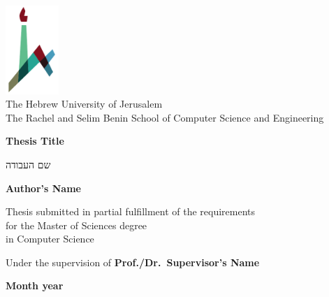 \documentclass[11pt]{book}
\begin{document}

\begin{titlepage}
    \begin{center}
        \vspace*{1cm}
        
        \includegraphics[width=0.15\textwidth]{huji_logo_notext.pdf}\\
        The Hebrew University of Jerusalem\\
        The Rachel and Selim Benin School of Computer Science and Engineering
        
        \vspace{2cm}
        
        {\Large \textbf{Thesis Title}}
        
        \vspace{1cm}
        {\Large שם העבודה}
        
        \vspace{1.5cm}
        
        \textbf{Author's Name}
        
        \vspace{1cm}
        
        Thesis submitted in partial fulfillment of the requirements\\for the Master of Sciences degree\\
        in Computer Science
        
        \vspace{1cm}
        
        Under the supervision of \textbf{Prof./Dr.~Supervisor's Name}
        
        \vfill
        
        \textbf{Month year}
    \end{center}
\end{titlepage}


%

\tableofcontents
\listoffigures

% 








\printbibliography[heading=bibliography]
\end{document}
